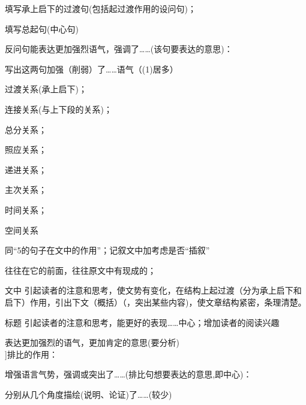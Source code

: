 \begin{asparaenum}[(1)]
\item 填写承上启下的过渡句(包括起过渡作用的设问句)；
 \item 填写总起句(中心句)
\end{asparaenum}

\begin{asparaenum}[(1)]
\item 反问句能表达更加强烈语气，强调了\ldots{}\ldots{}(该句要表达的意思)：
\item 写出这两句加强（削弱）了\ldots{}\ldots{}语气（(1)居多）
\end{asparaenum}

\begin{asparaenum}[(1)]
\item 过渡关系(承上启下)；
\item 连接关系(与上下段的关系)；
\item 总分关系；
\item 照应关系；
\item 递进关系；
\item 主次关系；
\item 时间关系；
\item 空间关系
\end{asparaenum}

同``5的句子在文中的作用''；记叙文中加考虑是否``插叙''

往往在它的前面，往往原文中有现成的；

\begin{compactdesc}
\item[文中]引起读者的注意和思考，使文势有变化，在结构上起过渡（分为承上启下和启下）作用，引出下文（概括）（，突出某些内容)，使文章结构紧密，条理清楚。
\item[标题]引起读者的注意和思考，能更好的表现\ldots{}\ldots{}中心；增加读者的阅读兴趣
\end{compactdesc}

表达更加强烈的语气，更加肯定的意思(要分析)\\

\hatsubsection[\hatb[6]{2}{2011-06-13}]{排比的作用：}
\begin{asparaenum}[(1)]
\item 增强语言气势，强调或突出了\ldots{}\ldots{}(排比句想要表达的意思,即中心)：
\item 分别从几个角度描绘(说明、论证)了\ldots{}\ldots{}(较少)
\end{asparaenum}

